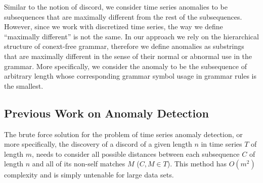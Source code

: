 \documentclass{llncs}
\begin{document}
Similar to the notion of discord, we consider time series anomalies to be subsequences that are maximally different from the rest of the subsequences. However, since we work with discretized time series, the way we define ``maximally different'' is not the same. In our approach we rely on the hierarchical structure of conext-free grammar, therefore we define anomalies as substrings that are maximally different in the sense of their normal or abnormal use in the grammar. More specifically, we consider the anomaly to be the subsequence of arbitrary length whose corresponding grammar symbol usage in grammar rules is the smallest.  





\subsection{Previous Work on Anomaly Detection}
The brute force solution for the problem of time series anomaly detection, or more specifically, the discovery of a discord of a given length $n$ in time series $T$ of length $m$, needs to consider all possible distances between each subsequence $C$ of length $n$ and all of its non-self matches $M$ ($C,M \in T$). This method has $O(m^{2})$ complexity and is simply untenable for large data sets. 
\end{document}
